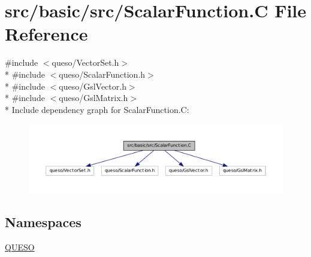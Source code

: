 \hypertarget{_scalar_function_8_c}{\section{src/basic/src/\-Scalar\-Function.C File Reference}
\label{_scalar_function_8_c}
}
{\ttfamily \#include $<$queso/\-Vector\-Set.\-h$>$}\\*
{\ttfamily \#include $<$queso/\-Scalar\-Function.\-h$>$}\\*
{\ttfamily \#include $<$queso/\-Gsl\-Vector.\-h$>$}\\*
{\ttfamily \#include $<$queso/\-Gsl\-Matrix.\-h$>$}\\*
Include dependency graph for Scalar\-Function.\-C\-:
\nopagebreak
\begin{figure}[H]
\begin{center}
\leavevmode
\includegraphics[width=350pt]{_scalar_function_8_c__incl}
\end{center}
\end{figure}
\subsection*{Namespaces}
\begin{DoxyCompactItemize}
\item 
\hyperlink{namespace_q_u_e_s_o}{Q\-U\-E\-S\-O}
\end{DoxyCompactItemize}
